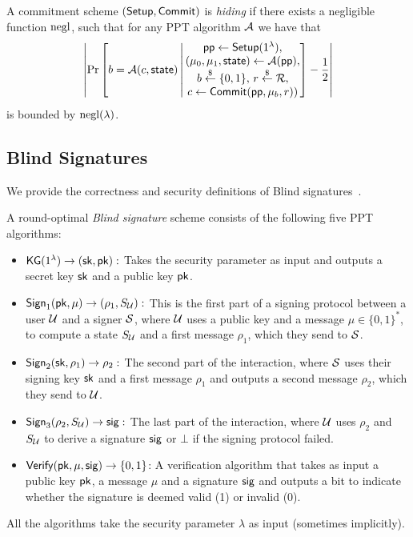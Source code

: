 \begin{definition}[Hiding]\label{def:hiding}
    A commitment scheme $(\mathsf{Setup},\mathsf{Commit})$ is \emph{hiding} if there exists a negligible function $\mathrm{negl}$, such that for any PPT algorithm $\mathcal{A}$ we have that  \[
       \left| \Pr \left[  b = \mathcal{A}(c, \mathsf{state})  \, \middle | \, \begin{matrix}
            \mathsf{pp} \gets \mathsf{Setup}(1^\lambda), \\
            (\mu_0,\mu_1,\mathsf{state})\gets \mathcal{A}(\mathsf{pp}), \\
            b\overset{\$}{\leftarrow} \{0,1\},\, r\overset{\$}{\leftarrow} \mathcal{R}, \\
            c \gets \mathsf{Commit}(\mathsf{pp},\mu_b,r)  )
        \end{matrix} \right] -\frac{1}{2} \right|     
    \] 
    is bounded by $\mathrm{negl}(\lambda)$.
\end{definition}



\subsection{Blind Signatures} \label{subsec:blind}


We provide the correctness and security definitions of Blind signatures~\cite{C:Chaum82}. 

\begin{definition}\label{def:blind}
A round-optimal \emph{Blind signature} scheme consists of the following five PPT algorithms:

\begin{itemize}
    \item $\mathsf{KG}(1^\lambda)\rightarrow (\mathsf{sk},\mathsf{pk}):$ Takes the security parameter as input and outputs a secret key $\mathsf{sk}$ and a public key $\mathsf{pk}$.
    \item $\mathsf{Sign}_1(\mathsf{pk},\mu) \rightarrow (\rho_1,S_{\mathcal{U}}):$ This is the first part of a signing protocol between a user $\mathcal{U}$ and a signer $\mathcal{S}$, where $\mathcal{U}$ uses a public key and a message $\mu \in \{0,1\}^\ast$, to compute a state $S_{\mathcal{U}}$ and a first message $\rho_1$, which they send to $\mathcal{S}$.
    \item $\mathsf{Sign}_2(\mathsf{sk}, \rho_1) \rightarrow \rho_2 :$ The second part of the interaction, where $\mathcal{S}$ uses their signing key $\mathsf{sk}$ and a first message $\rho_1$ and outputs a second message $\rho_2$, which they send to $\mathcal{U}$.
    \item $\mathsf{Sign}_3(\rho_2, S_{\mathcal{U}}) \rightarrow \mathsf{sig}:$ The last part of the interaction, where $\mathcal{U}$ uses $\rho_2$ and $S_{\mathcal{U}}$ to derive a signature $\mathsf{sig}$ or $\bot$ if the signing protocol failed.
    \item $\mathsf{Verify}(\mathsf{pk},\mu,\mathsf{sig}) \rightarrow \{0,1\}$: A verification algorithm that takes as input a public key $\mathsf{pk}$, a message $\mu$ and a signature $\mathsf{sig}$ and outputs a bit to indicate whether the signature is deemed valid (1) or invalid (0).
\end{itemize}

All the algorithms take the security parameter $\lambda$ as input (sometimes implicitly).
\end{definition}

